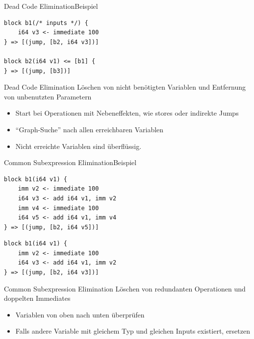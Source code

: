 \begin{frame}[fragile]{Dead Code Elimination}{Beispiel}
    \vspace{1cm}
\begin{lstlisting}[language=SbtIr]
block b1(/* inputs */) {
    i64 v3 <- immediate 100
} => [(jump, [b2, i64 v3])]

block b2(i64 v1) <= [b1] {
} => [(jump, [b3])]
\end{lstlisting}

\end{frame}

\begin{frame}[fragile]{Dead Code Elimination}
    Löschen von nicht benötigten Variablen und Entfernung von unbenutzten Parametern

    \begin{itemize}
        \setlength\itemsep{0.5em}
        \item Start bei Operationen mit Nebeneffekten, wie stores oder indirekte Jumps
        \item ``Graph-Suche'' nach allen erreichbaren Variablen
        \item Nicht erreichte Variablen sind überflüssig.
    \end{itemize}
\end{frame}
\clearpage

\begin{frame}[fragile]{Common Subexpression Elimination}{Beispiel}

\begin{lstlisting}[language=SbtIr]
block b1(i64 v1) {
    imm v2 <- immediate 100
    i64 v3 <- add i64 v1, imm v2
    imm v4 <- immediate 100
    i64 v5 <- add i64 v1, imm v4
} => [(jump, [b2, i64 v5])]
\end{lstlisting}

\pause

\vspace{1cm}

\begin{lstlisting}[language=SbtIr]
block b1(i64 v1) {
    imm v2 <- immediate 100
    i64 v3 <- add i64 v1, imm v2
} => [(jump, [b2, i64 v3])]
\end{lstlisting}

\end{frame}

\begin{frame}[fragile]{Common Subexpression Elimination}
    Löschen von redundanten Operationen und doppelten Immediates

    \begin{itemize}
        \setlength\itemsep{0.5em}
        \item Variablen von oben nach unten überprüfen
        \item Falls andere Variable mit gleichem Typ und gleichen Inputs existiert, ersetzen
    \end{itemize}
\end{frame}
\clearpage

